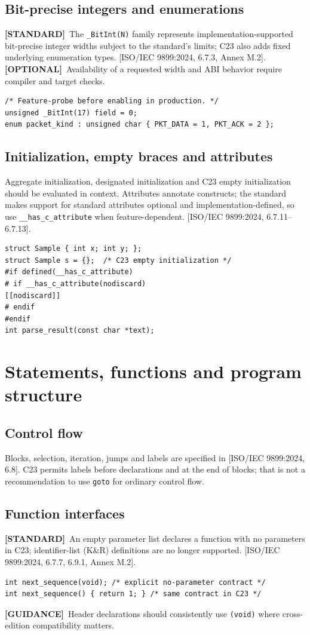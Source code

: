 \documentclass[10pt,letterpaper,oneside]{report}
\newcommand{\refcl}[1]{\textsf{\footnotesize[ISO/IEC 9899:2024, #1]}}
\newcommand{\standard}{\textbf{[STANDARD]}}
\newcommand{\optional}{\textbf{[OPTIONAL]}}
\newcommand{\guidance}{\textbf{[GUIDANCE]}}
\begin{document}
\section{Bit-precise integers and enumerations}
\standard\ The \texttt{\_BitInt(N)} family represents implementation-supported bit-precise integer widths subject to the standard's limits; C23 also adds fixed underlying enumeration types. \refcl{6.7.3, Annex M.2}.\optional\ Availability of a requested width and ABI behavior require compiler and target checks.
\begin{lstlisting}
/* Feature-probe before enabling in production. */
unsigned _BitInt(17) field = 0;
enum packet_kind : unsigned char { PKT_DATA = 1, PKT_ACK = 2 };
\end{lstlisting}
\section{Initialization, empty braces and attributes}
Aggregate initialization, designated initialization and C23 empty initialization should be evaluated in context. Attributes annotate constructs; the standard makes support for standard attributes optional and implementation-defined, so use \texttt{\_\_has\_c\_attribute} when feature-dependent. \refcl{6.7.11--6.7.13}.
\begin{lstlisting}
struct Sample { int x; int y; };
struct Sample s = {};  /* C23 empty initialization */
#if defined(__has_c_attribute)
# if __has_c_attribute(nodiscard)
[[nodiscard]]
# endif
#endif
int parse_result(const char *text);
\end{lstlisting}
\chapter{Statements, functions and program structure}
\section{Control flow}
Blocks, selection, iteration, jumps and labels are specified in \refcl{6.8}. C23 permits labels before declarations and at the end of blocks; that is not a recommendation to use \texttt{goto} for ordinary control flow.
\section{Function interfaces}
\standard\ An empty parameter list declares a function with no parameters in C23; identifier-list (K\&R) definitions are no longer supported. \refcl{6.7.7, 6.9.1, Annex M.2}.
\begin{lstlisting}
int next_sequence(void); /* explicit no-parameter contract */
int next_sequence() { return 1; } /* same contract in C23 */
\end{lstlisting}
\guidance\ Header declarations should consistently use \texttt{(void)} where cross-edition compatibility matters.
\end{document}
